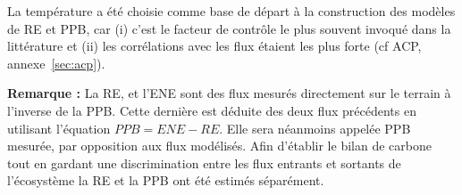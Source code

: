 
 


La température a été choisie comme base de départ à la construction des modèles de RE et PPB, car (i) c'est le facteur de contrôle le plus souvent invoqué dans la littérature et (ii) les corrélations avec les flux étaient les plus forte (cf ACP, annexe~\ref{sec:acp}).

\begin{center}
\begin{minipage}{.85\textwidth}
\setlength{\parindent}{-10pt}%
\onehalfspacing
\textbf{Remarque :} La RE, et l'ENE sont des flux mesurés directement sur le terrain à l'inverse de la PPB.
Cette dernière est déduite des deux flux précédents en utilisant l'équation $PPB = ENE - RE$.
Elle sera néanmoins appelée PPB mesurée, par opposition aux flux modélisés.
Afin d'établir le bilan de carbone tout en gardant une discrimination entre les flux entrants et sortants de l'écosystème la RE et la PPB ont été estimés séparément.
\end{minipage}
\end{center}

